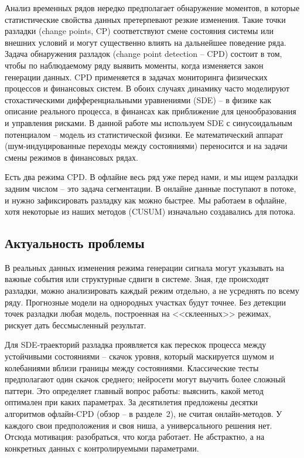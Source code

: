 \documentclass[12pt,a4paper]{article}
\begin{document}
Анализ временных рядов нередко предполагает обнаружение моментов, в которые статистические свойства данных претерпевают резкие изменения. Такие точки разладки (change points, CP) соответствуют смене состояния системы или внешних условий и могут существенно влиять на дальнейшее поведение ряда. Задача обнаружения разладок (change point detection  -- CPD) состоит в том, чтобы по наблюдаемому ряду выявить моменты, когда изменяется закон генерации данных. CPD применяется в задачах мониторинга физических процессов и финансовых систем. В обоих случаях динамику часто моделируют стохастическими дифференциальными уравнениями (SDE)  -- в физике как описание реального процесса, в финансах как приближение для ценообразования и управления рисками. В данной работе мы используем SDE с синусоидальным потенциалом -- модель из статистической физики. Ее математический аппарат (шум-индуцированные переходы между состояниями) переносится и на задачи смены режимов в финансовых рядах.

Есть два режима CPD. В офлайне весь ряд уже перед нами, и мы ищем разладки задним числом  -- это задача сегментации. В онлайне данные поступают в потоке, и нужно зафиксировать разладку как можно быстрее. Мы работаем в офлайне, хотя некоторые из наших методов (CUSUM) изначально создавались для потока.

\subsection{Актуальность проблемы}

В реальных данных изменения режима генерации сигнала могут указывать на важные события или структурные сдвиги в системе. Зная, где происходят разладки, можно анализировать каждый режим отдельно, а не усреднять по всему ряду. Прогнозные модели на однородных участках будут точнее. Без детекции точек разладки любая модель, построенная на <<склеенных>> режимах, рискует дать бессмысленный результат.

Для SDE-траекторий разладка проявляется как перескок процесса между устойчивыми состояниями  -- скачок уровня, который маскируется шумом и колебаниями вблизи границы между состояниями. Классические тесты предполагают один скачок среднего; нейросети могут выучить более сложный паттерн. Это определяет главный вопрос работы: выяснить, какой метод оптимален при каких параметрах. За десятилетия предложены десятки алгоритмов офлайн-CPD (обзор  -- в разделе~2), не считая онлайн-методов. У каждого свои предположения и своя ниша, а универсального решения нет. Отсюда мотивация: разобраться, что когда работает. Не абстрактно, а на конкретных данных с контролируемыми параметрами.
\end{document}
